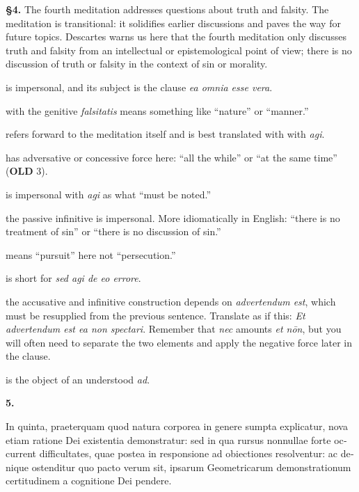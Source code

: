 \prenotes

\textbf{§4.} The fourth meditation addresses questions about truth and falsity. The meditation is transitional: it solidifies earlier discussions and paves the way for future topics. Descartes warns us here that the fourth meditation only discusses truth and falsity from an intellectual or epistemological point of view; there is no discussion of truth or falsity in the context of sin or morality. 

 is impersonal, and its subject is the clause \textit{ea omnia esse vera}.

 with the genitive \textit{falsitatis} means something like ``nature'' or ``manner.''

 refers forward to the meditation itself and is best translated with with \textit{agi}.

 has adversative or concessive force here: ``all the while'' or ``at the same time'' (\textbf{OLD} 3).

 is impersonal with \textit{agi} as what ``must be noted.''

 the passive infinitive is impersonal. More idiomatically in English: ``there is no treatment of sin'' or ``there is no discussion of sin.''

 means ``pursuit'' here not ``persecution.''

 is short for \textit{sed agi de eo errore}.

 the accusative and infinitive construction depends on \textit{advertendum est}, which must be resupplied from the previous sentence. Translate as if this: \textit{Et advertendum est ea non spectari}. Remember that \textit{nec} amounts \textit{et nōn}, but you will often need to separate the two elements and apply the negative force later in the clause.

 is the object of an understood \textit{ad}.

\clearpage

\beginnumbering
\pstart
\textbf{5.} \begin{latin}In quinta, praeterquam quod natura corporea in genere sumpta explicatur, nova etiam ratione Dei existentia demonstratur: sed in qua rursus nonnullae forte occurrent difficultates, quae postea in responsione ad obiectiones resolventur: ac denique ostenditur quo pacto verum sit, ipsarum Geometricarum demonstrationum certitudinem a cognitione Dei pendere.\end{latin}
\pend
\endnumbering

